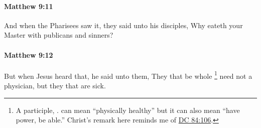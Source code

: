 		\paragraph{Matthew 9:11} %
			\label{MATTHEW-9-11}

			And when the Pharisees saw it, they said unto his disciples, Why eateth your Master with publicans and sinners?

			\begin{framed}
			\scriptsize
				\begin{compactdesc}
					\item[SBLG] 
				\end{compactdesc}
			\end{framed}

		\paragraph{Matthew 9:12} %
			\label{MATTHEW-9-12}

			But when Jesus heard that, he said unto them, They that be whole%
				\footnote{%
					A participle, .  can mean ``physically healthy'' but it can also mean ``have power, be able.'' Christ's remark here reminds me of \hyperref[DC84-106]{DC 84:106}.
					}
			need not a physician, but they that are sick.

